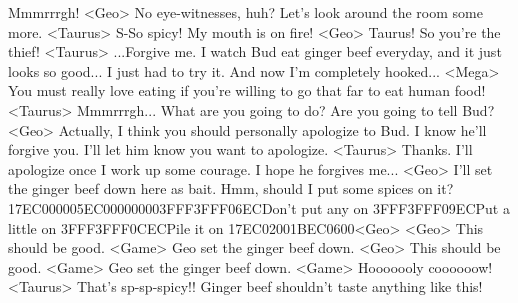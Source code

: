 Mmmrrrgh! 
<Geo> No eye-witnesses, huh? 
Let's look around the room some more. 
<Taurus> S-So spicy! My mouth is on fire! 
<Geo> Taurus! So you're the thief! 
<Taurus> ...Forgive me. 
I watch Bud eat ginger beef everyday, and it just looks so good... 
I just had to try it. 
And now I'm completely hooked... 
<Mega> You must really love eating if you're willing to go that far to eat human food! 
<Taurus> Mmmrrrgh... 
What are you going to do? Are you going to tell Bud? 
<Geo> Actually, I think you should personally apologize to Bud. 
I know he'll forgive you. 
I'll let him know you want to apologize. 
<Taurus> Thanks. I'll apologize once I work up some courage. 
I hope he forgives me... 
<Geo> I'll set the ginger beef down here as bait. Hmm, should I put some spices on it? 
{17}{EC}{00}{00}{05}{EC}{00}{00}{00}{00}{3F}{FF}{3F}{FF}{06}{EC}Don't put any on {3F}{FF}{3F}{FF}{09}{EC}Put a little on {3F}{FF}{3F}{FF}{0C}{EC}Pile it on 
{17}{EC}{02}{00}{1B}{EC}{06}{00}<Geo> 
<Geo> This should be good. 
<Game> Geo set the ginger beef down. 
<Geo> This should be good. 
<Game> Geo set the ginger beef down. 
<Game> Hooooooly coooooow! 
<Taurus> That's sp-sp-spicy!! Ginger beef shouldn't taste anything like this! 
